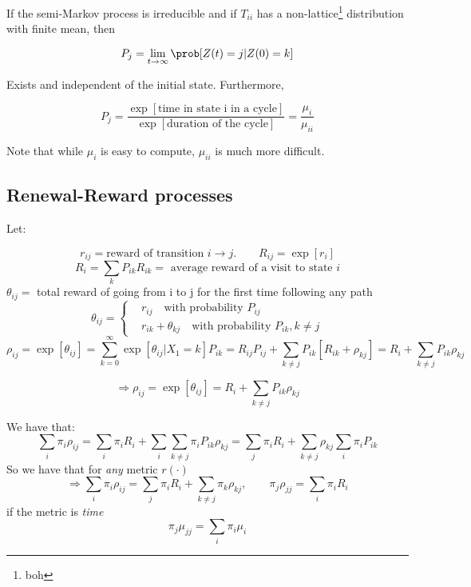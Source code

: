 \begin{theorem}
	If the semi-Markov process is irreducible and if $T_{ii}$ has a non-lattice\footnote{boh} distribution with finite mean, then

	$$P_j = \lim_{t \to \infty} \prob[Z(t)=j | Z(0)=k]$$

	Exists and independent of the initial state. Furthermore,

	$$P_j = \frac{\exp[\mbox{time in state i in a cycle}]}{\exp[\mbox{duration of the cycle}]} = \frac{\mu_i}{\mu_{ii}}$$

\end{theorem}
Note that while $\mu_i$ is easy to compute, $\mu_{ii}$ is much more difficult.

\subsection{Renewal-Reward processes}

Let:

\begin{equation}
r_{ij} = \mbox{reward of transition } i\rightarrow j. \qquad R_{ij} = \exp[r_i]
\end{equation}
\begin{equation}
R_i = \sum_k P_{ik} R_{ik} = \mbox{ average reward of a visit to state } i
\end{equation}
$\theta_{ij} = $ total reward of going from i to j for the first time following any path
\begin{equation}
\theta_{ij} = \begin{cases}
&r_{ij} \quad\mbox{with probability } P_{ij}\\
&r_{ik}+\theta_{kj}  \quad\mbox{with probability } P_{ik}, k\neq j
\end{cases}
\end{equation}
\begin{equation*}
\rho_{ij} = \exp[\theta_{ij}] = \sum_{k=0}^{\infty}\exp[\theta_{ij}| X_1=k] P_{ik} = R_{ij}P_{ij} +\sum_{k \neq j} P_{ik} [R_{ik}+\rho_{kj}] = R_i + \sum_{k \neq j}P_{ik}\rho_{kj}
\end{equation*}

\begin{equation}
\Rightarrow\rho_{ij} = \exp[\theta_{ij}] =  R_i + \sum_{k \neq j}P_{ik}\rho_{kj}
\end{equation}


We have that:
\begin{equation*}
\sum_i \pi_i \rho_{ij} = \sum_i \pi_i R_i + \sum_i \sum_{k \neq j} \pi_i P_{ik} \rho_{kj} = \sum_j \pi_i R_i + \sum_{k \neq j}\rho_{kj}\sum_i\pi_i P_{ik}
\end{equation*}
So we have that for \emph{any} metric $r(\cdot)$
\begin{equation}
\Rightarrow\sum_i \pi_i \rho_{ij} = \sum_j \pi_i R_i + \sum_{k \neq j}\pi_k\rho_{kj},\qquad \pi_j\rho_{jj} = \sum_i \pi_i R_i
\end{equation}
if the metric is \emph{time}
\begin{equation}
\pi_j \mu_{jj} = \sum_i \pi_i \mu_i
\end{equation}

